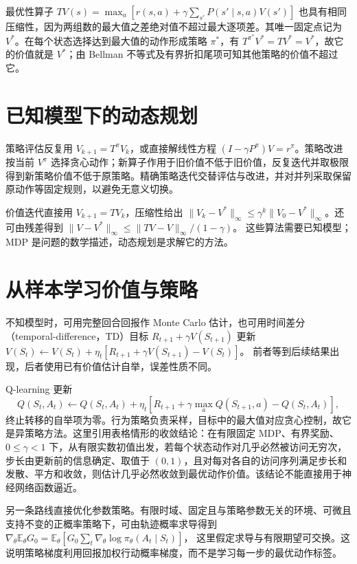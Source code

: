 \documentclass[UTF8,12pt,a4paper,fontset=fandol]{ctexbook}
\begin{document}
最优性算子 $TV(s)=\max_a[r(s,a)+\gamma\sum_{s'}P(s'\mid s,a)V(s')]$ 也具有相同压缩性，因为两组数的最大值之差绝对值不超过最大逐项差。其唯一固定点记为 $V^*$。在每个状态选择达到最大值的动作形成策略 $\pi^*$，有 $T^{\pi^*}V^*=TV^*=V^*$，故它的价值就是 $V^*$；由 Bellman 不等式及有界折扣尾项可知其他策略的价值不超过它。

\section{已知模型下的动态规划}

策略评估反复用 $V_{k+1}=T^\pi V_k$，或直接解线性方程 $(I-\gamma P^\pi)V=r^\pi$。策略改进按当前 $V^\pi$ 选择贪心动作；新算子作用于旧价值不低于旧价值，反复迭代并取极限得到新策略价值不低于原策略。精确策略迭代交替评估与改进，并对并列采取保留原动作等固定规则，以避免无意义切换。

价值迭代直接用 $V_{k+1}=TV_k$，压缩性给出 $\|V_k-V^*\|_\infty\leq\gamma^k\|V_0-V^*\|_\infty$。还可由残差得到
$\|V-V^*\|_\infty\leq\|TV-V\|_\infty/(1-\gamma)$。
这些算法需要已知模型；MDP 是问题的数学描述，动态规划是求解它的方法。

\section{从样本学习价值与策略}

不知模型时，可用完整回合回报作 Monte Carlo 估计，也可用时间差分（temporal-difference，TD）目标 $R_{t+1}+\gamma V(S_{t+1})$ 更新
$V(S_t)\leftarrow V(S_t)+\eta_t[R_{t+1}+\gamma V(S_{t+1})-V(S_t)]$。
前者等到后续结果出现，后者使用已有价值估计自举，误差性质不同。

Q-learning 更新
\begin{equation}
 Q(S_t,A_t)\leftarrow Q(S_t,A_t)+\eta_t\left[
 R_{t+1}+\gamma\max_aQ(S_{t+1},a)-Q(S_t,A_t)\right],
 \label{eq:ml-qlearning-update}
\end{equation}
终止转移的自举项为零。行为策略负责采样，目标中的最大值对应贪心控制，故它是异策略方法。这里引用表格情形的收敛结论\cite{ml-qlearning}：在有限固定 MDP、有界奖励、$0\leq\gamma<1$ 下，从有限实数初值出发，若每个状态动作对几乎必然被访问无穷次，步长由更新前的信息确定、取值于 $(0,1)$，且对每对各自的访问序列满足步长和发散、平方和收敛，则估计几乎必然收敛到最优动作价值。该结论不能直接用于神经网络函数逼近。

另一条路线直接优化参数策略。有限时域、固定且与策略参数无关的环境、可微且支持不变的正概率策略下，可由轨迹概率求导得到
$\nabla_\theta\mathbb E_\theta G_0=\mathbb E_\theta[G_0\sum_t\nabla_\theta\log\pi_\theta(A_t\mid S_t)]$，
这里假定求导与有限期望可交换。这说明策略梯度利用回报加权行动概率梯度，而不是学习每一步的最优动作标签。
\end{document}
